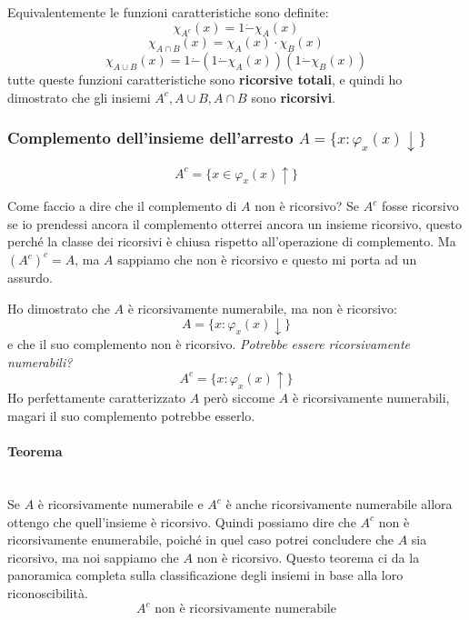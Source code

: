\documentclass{article}
\begin{document}
Equivalentemente le funzioni caratteristiche sono definite:
$$\chi_{A^c}(x)=1\dot{-}\chi_A(x)$$
$$\chi_{A\cap B}(x)=\chi_A(x)\cdot\chi_B(x)$$
$$\chi_{A\cup B}(x)=1\dot{-}(1\dot{-}\chi_A(x))(1\dot{-}\chi_B(x))$$
tutte queste funzioni caratteristiche sono \textbf{ricorsive totali},
e quindi ho dimostrato che gli insiemi $A^c,A\cup B, A\cap B$ sono \textbf{ricorsivi}.

\subsubsection{Complemento dell'insieme dell'arresto $A=\{x:\varphi_x(x)\downarrow\}$}
$$A^c=\{x\in\varphi_x(x)\uparrow\}$$

Come faccio a dire che il complemento di $A$ non è ricorsivo? Se $A^c$ fosse
ricorsivo se io prendessi ancora il complemento otterrei ancora un insieme ricorsivo,
questo perché la classe dei ricorsivi è chiusa rispetto all'operazione di complemento.
Ma $(A^c)^c=A$, ma $A$ sappiamo che non è ricorsivo e questo mi porta ad un assurdo.

Ho dimostrato che $A$ è ricorsivamente numerabile, ma non è ricorsivo:
$$A=\{x:\varphi_x(x)\downarrow\}$$
e che il suo complemento non è ricorsivo. \textit{Potrebbe essere ricorsivamente
numerabili?}
$$A^c=\{x:\varphi_x(x)\uparrow\}$$
Ho perfettamente caratterizzato $A$ però siccome $A$ è ricorsivamente numerabili,
magari il suo complemento potrebbe esserlo.

\paragraph{Teorema}\mbox{}\\
Se $A$ è ricorsivamente numerabile e $A^c$ è anche ricorsivamente numerabile allora ottengo
che quell'insieme è ricorsivo. Quindi possiamo dire che $A^c$ non è ricorsivamente
enumerabile, poiché in quel caso potrei concludere che $A$ sia ricorsivo, ma noi sappiamo
che $A$ non è ricorsivo.
Questo teorema ci da la panoramica completa sulla classificazione degli insiemi in base alla
loro riconoscibilità.
$$A^c\text{ non è ricorsivamente numerabile}$$
\end{document}
